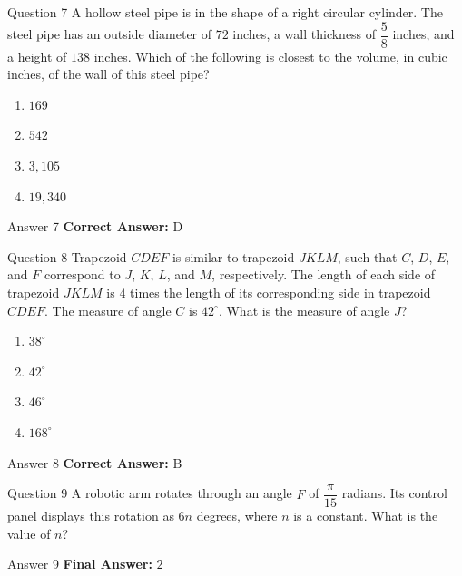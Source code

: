\documentclass{beamer}
\begin{document}
\begin{frame}{Question 7}
\small
A hollow steel pipe is in the shape of a right circular cylinder.
The steel pipe has an outside diameter of \(72\) inches, a wall thickness of \(\dfrac{5}{8}\) inches, and a height of \(138\) inches.
Which of the following is closest to the volume, in cubic inches, of the wall of this steel pipe?
\vspace{0.35cm}
\begin{enumerate}
    \item[A.] \(169\)
    \item[B.] \(542\)
    \item[C.] \(3{,}105\)
    \item[D.] \(19{,}340\)
\end{enumerate}
\end{frame}
\begin{frame}{Answer 7}
\small
\textbf{Correct Answer:} D
\end{frame}

\begin{frame}{Question 8}
\small
Trapezoid \(CDEF\) is similar to trapezoid \(JKLM\), such that \(C\), \(D\), \(E\), and \(F\) correspond to \(J\), \(K\), \(L\), and \(M\), respectively. The length of each side of trapezoid \(JKLM\) is \(4\) times the length of its corresponding side in trapezoid \(CDEF\). The measure of angle \(C\) is \(42^\circ\). What is the measure of angle \(J\)?
\vspace{0.35cm}
\begin{enumerate}
    \item[A.] \(38^\circ\)
    \item[B.] \(42^\circ\)
    \item[C.] \(46^\circ\)
    \item[D.] \(168^\circ\)
\end{enumerate}
\end{frame}
\begin{frame}{Answer 8}
\small
\textbf{Correct Answer:} B
\end{frame}

\begin{frame}{Question 9}
\small
A robotic arm rotates through an angle \(F\) of \(\dfrac{\pi}{15}\) radians. Its control panel displays this rotation as \(6n\) degrees, where \(n\) is a constant. What is the value of \(n\)?
\end{frame}
\begin{frame}{Answer 9}
\small
\textbf{Final Answer:} $\boxed{2}$
\end{frame}
\end{document}

